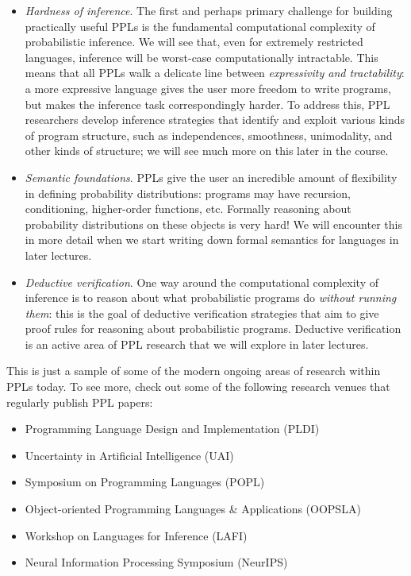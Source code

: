 \documentclass{tufte-handout}
\begin{document}
\begin{itemize}
  \item \emph{Hardness of inference}. The first and perhaps primary challenge
  for building practically useful PPLs is the fundamental computational
  complexity of probabilistic inference. We will see that, even for extremely 
  restricted languages, inference will be worst-case computationally intractable. 
  This means that all PPLs walk a delicate line between \emph{expressivity and
  tractability}: a more expressive language gives the user more freedom to write 
  programs, but makes the inference task correspondingly harder. To address this,
  PPL researchers develop inference strategies that identify and exploit various kinds 
  of program structure, such as independences, smoothness, unimodality, and other kinds of
  structure; we will see much more on this later in the course.

  \item \emph{Semantic foundations}. PPLs give the user an incredible amount of 
  flexibility in defining probability distributions: programs may have recursion, 
  conditioning, higher-order functions, etc. Formally reasoning about probability 
  distributions on these objects is very hard! We will encounter this in more detail 
  when we start writing down formal semantics for languages in later lectures.

  \item \emph{Deductive verification}. One way around the computational complexity 
  of inference is to reason about what probabilistic 
  programs do \emph{without running them}: this is the goal of deductive verification 
  strategies that aim to give proof rules for reasoning about probabilistic 
  programs. Deductive verification is an active area of PPL research that we will 
  explore in later lectures.
\end{itemize}

This is just a sample of some of the modern ongoing areas of research within PPLs 
today. To see more, check out some of the following research venues that regularly 
publish PPL papers:
\begin{itemize}
  \item Programming Language Design and Implementation (PLDI)
  \item Uncertainty in Artificial Intelligence (UAI)
  \item Symposium on Programming Languages (POPL)
  \item Object-oriented Programming Languages \& Applications (OOPSLA)
  \item Workshop on Languages for Inference (LAFI)
  \item Neural Information Processing Symposium (NeurIPS)
\end{itemize}



\end{document}
